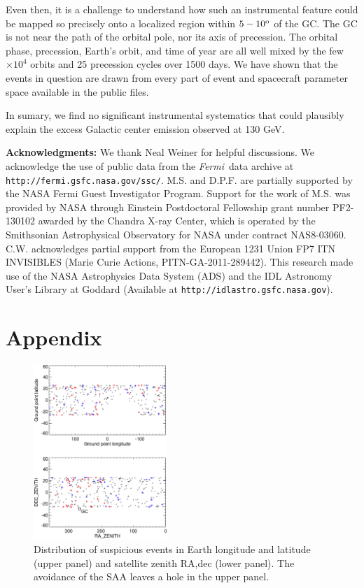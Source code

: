 \documentclass[aps,twocolumn,prd,superscriptaddress,showpacs,nofootinbib,fixfloat]{revtex4}
\newcommand{\Fermi}{{\slshape Fermi}}
\newcommand{\degree}{^{\rm o}}
\begin{document}
Even then, it is a challenge to understand how such an
instrumental feature could be mapped so precisely onto a
localized region within $5-10\degree$ of the GC.  The GC is
not near the path of the orbital pole, nor its axis of
precession.  The orbital phase, precession, Earth's orbit,
and time of year are all well mixed by the few $\times10^4$
orbits and 25 precession cycles over 1500 days.  We have
shown that the events in question are drawn from every part
of event and spacecraft parameter space available in the
public files. 

In sumary, we find no significant instrumental systematics that could
plausibly explain the excess Galactic center emission observed at 130 GeV. 

\vskip 0.15in {\bf \noindent Acknowledgments:} We thank Neal
Weiner for helpful discussions. We acknowledge the use of
public data from the \Fermi\ data archive at
\texttt{http://fermi.gsfc.nasa.gov/ssc/}.  M.S. and
D.P.F. are partially supported by the NASA Fermi Guest
Investigator Program. Support for the work of M.S. was
provided by NASA through Einstein Postdoctoral Fellowship
grant number PF2-130102 awarded by the Chandra X-ray Center,
which is operated by the Smithsonian Astrophysical
Observatory for NASA under contract
NAS8-03060. C.W. acknowledges partial support from the
European 1231 Union FP7 ITN INVISIBLES (Marie Curie Actions,
PITN-GA-2011-289442).  This research made use of the NASA
Astrophysics Data System (ADS) and the IDL Astronomy User's
Library at Goddard (Available at
\texttt{http://idlastro.gsfc.nasa.gov}).

\section{Appendix}

\begin{figure}
  \centering
  \includegraphics[width=0.45\textwidth]{plots/geo-lonlat.ps}
  \caption{Distribution of suspicious events in Earth
  longitude and latitude (upper panel) and satellite zenith
  RA,dec (lower panel).   The avoidance of the SAA leaves a
  hole in the upper panel.}
  \label{fig:geo-lonlat}
\end{figure}
\end{document}
